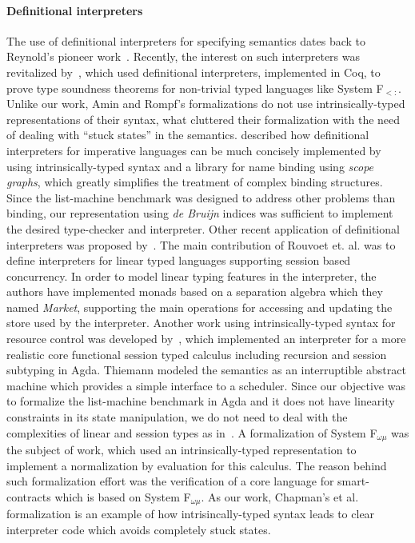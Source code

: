 \documentclass[sigconf]{acmart}
\theoremstyle{definition}
\begin{document}
\paragraph{Definitional interpreters}{
The use of definitional interpreters for specifying semantics dates back to Reynold's pioneer work~\cite{Reynolds72}.
Recently, the interest on such interpreters was revitalized by~\citet{Amin17}, which used definitional
interpreters, implemented in Coq, to prove type soundness theorems for non-trivial typed languages like System F$_{<:}$.
Unlike our work, Amin and Rompf's formalizations do not use intrinsically-typed representations of their syntax, what cluttered
their formalization with the need of dealing with ``stuck states'' in the semantics. \citet{Poulsen18} described how
definitional interpreters for imperative languages can be much concisely implemented by using intrinsically-typed syntax and a
library for name binding using \emph{scope graphs}, which greatly simplifies the treatment of complex
binding structures. Since the list-machine benchmark was designed to address other problems than binding, our representation
using \emph{de Bruijn} indices was sufficient to implement the desired type-checker and interpreter.
Other recent application of definitional interpreters was proposed by~\citet{Rouvoet20}. The main contribution
of Rouvoet et. al. was to define interpreters for linear typed languages supporting session based concurrency. In order to model
linear typing features in the interpreter, the authors have implemented monads based on a separation algebra which they
named \emph{Market}, supporting the main operations for accessing and updating the store used by the interpreter.
Another work using intrinsically-typed syntax for resource control was developed by~\citet{Thiemann19}, which
implemented an interpreter for a more realistic core functional session typed calculus including recursion and
session subtyping in Agda. Thiemann modeled the semantics as an interruptible abstract machine which provides a
simple interface to a scheduler. Since our objective was to formalize the list-machine benchmark in Agda and it
does not have linearity constraints in its state manipulation, we do not need to deal with the complexities
of linear and session types as in~\cite{Rouvoet20,Thiemann19}. A formalization of System F$_{\omega\mu}$ was
the subject of \citet{ChapmanKNW19} work, which used an intrinsically-typed representation to 
implement a normalization by evaluation for this calculus. The reason behind such formalization effort was
the verification of a core language for smart-contracts which is based on System F$_{\omega\mu}$. As our work,
Chapman's et al. formalization is an example of how intrisincally-typed syntax leads to clear interpreter code
which avoids completely stuck states.}
\end{document}
